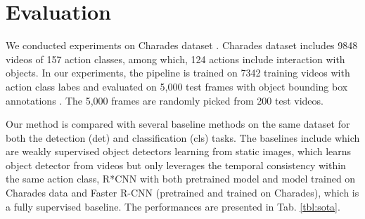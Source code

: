 \vspace{-0.2\baselineskip}
\section{Evaluation}
\vspace{-0.3\baselineskip}
\label{sec:evaluation}

We conducted experiments on Charades dataset \cite{sigurdsson2016hollywood}. Charades dataset includes 9848 videos of 157 action classes, among which, 124 actions include interaction with objects. In our experiments, the pipeline is trained on 7342 training videos with action class labes and evaluated on 5,000 test frames with object bounding box annotations \cite{}. The 5,000 frames are randomly picked from 200 test videos. 

Our method is compared with several baseline methods on the same dataset for both the detection (det) and classification (cls) tasks. The baselines include \cite{bilen2016weakly,kantorov2016contextlocnet} which are weakly supervised object detectors learning from static images, \cite{yuan2017temporal} which learns object detector from videos but only leverages the temporal consistency within the same action class, R*CNN \cite{gkioxari2015contextual} with both pretrained model and model trained on Charades data and Faster R-CNN (pretrained and trained on Charades), which is a fully supervised baseline. The performances are presented in Tab. \ref{tbl:sota}.

